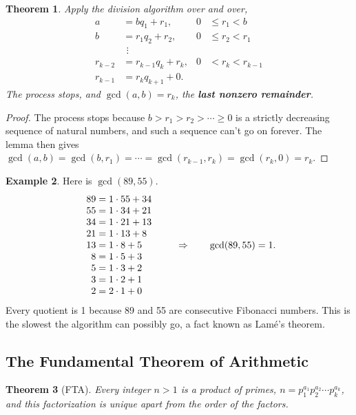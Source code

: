 \documentclass[11pt,a4paper]{article}
\newtheorem{theorem}{Theorem}[section]
\theoremstyle{definition}
\newtheorem{example}[theorem]{Example}
\theoremstyle{noteit}
\theoremstyle{note}
\begin{document}
\begin{theorem}
Apply the division algorithm over and over,
\[
\begin{aligned}
a&=bq_1+r_1, & 0&\le r_1<b\\
b&=r_1q_2+r_2, & 0&\le r_2<r_1\\
&\ \,\vdots\\
r_{k-2}&=r_{k-1}q_k+r_k, & 0&<r_k<r_{k-1}\\
r_{k-1}&=r_kq_{k+1}+0.
\end{aligned}
\]
The process stops, and $\gcd(a,b)=r_k$, the \textbf{last nonzero remainder}.
\end{theorem}

\begin{proof}
The process stops because $b>r_1>r_2>\cdots\ge 0$ is a strictly decreasing sequence of natural numbers, and such a sequence can't go on forever. The lemma then gives $\gcd(a,b)=\gcd(b,r_1)=\cdots=\gcd(r_{k-1},r_k)=\gcd(r_k,0)=r_k$.
\end{proof}

\begin{example}
Here is $\gcd(89,55)$.
\[
\begin{array}{r@{\;=\;}l}
89 & 1\cdot 55+34\\
55 & 1\cdot 34+21\\
34 & 1\cdot 21+13\\
21 & 1\cdot 13+8\\
13 & 1\cdot 8+5\\
8 & 1\cdot 5+3\\
5 & 1\cdot 3+2\\
3 & 1\cdot 2+1\\
2 & 2\cdot 1+0
\end{array}
\qquad\Rightarrow\qquad \gcd(89,55)=1.
\]
Every quotient is 1 because 89 and 55 are consecutive Fibonacci numbers. This is the slowest the algorithm can possibly go, a fact known as Lamé's theorem.
\end{example}

\subsection{The Fundamental Theorem of Arithmetic}

\begin{theorem}[FTA]
Every integer $n>1$ is a product of primes, $n=p_1^{a_1}p_2^{a_2}\cdots p_k^{a_k}$, and this factorization is unique apart from the order of the factors.
\end{theorem}
\end{document}
